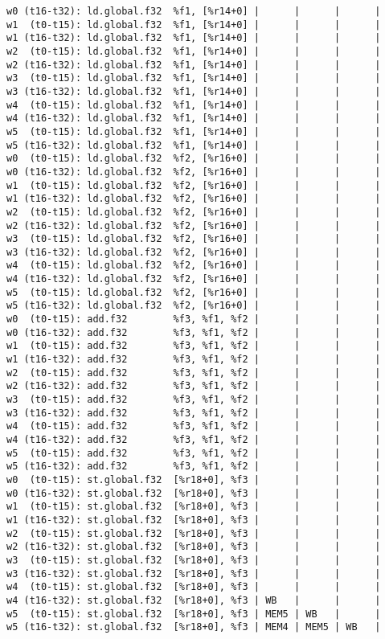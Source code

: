 \documentclass[11pt]{article}
\begin{document}
\begin{Answer}
\begin{verbatim}
w0 (t16-t32): ld.global.f32  %f1, [%r14+0] |      |      |      | 
w1  (t0-t15): ld.global.f32  %f1, [%r14+0] |      |      |      | 
w1 (t16-t32): ld.global.f32  %f1, [%r14+0] |      |      |      | 
w2  (t0-t15): ld.global.f32  %f1, [%r14+0] |      |      |      | 
w2 (t16-t32): ld.global.f32  %f1, [%r14+0] |      |      |      |
w3  (t0-t15): ld.global.f32  %f1, [%r14+0] |      |      |      |
w3 (t16-t32): ld.global.f32  %f1, [%r14+0] |      |      |      |
w4  (t0-t15): ld.global.f32  %f1, [%r14+0] |      |      |      |
w4 (t16-t32): ld.global.f32  %f1, [%r14+0] |      |      |      |
w5  (t0-t15): ld.global.f32  %f1, [%r14+0] |      |      |      |
w5 (t16-t32): ld.global.f32  %f1, [%r14+0] |      |      |      |
w0  (t0-t15): ld.global.f32  %f2, [%r16+0] |      |      |      |
w0 (t16-t32): ld.global.f32  %f2, [%r16+0] |      |      |      |
w1  (t0-t15): ld.global.f32  %f2, [%r16+0] |      |      |      |
w1 (t16-t32): ld.global.f32  %f2, [%r16+0] |      |      |      |
w2  (t0-t15): ld.global.f32  %f2, [%r16+0] |      |      |      |
w2 (t16-t32): ld.global.f32  %f2, [%r16+0] |      |      |      |
w3  (t0-t15): ld.global.f32  %f2, [%r16+0] |      |      |      |
w3 (t16-t32): ld.global.f32  %f2, [%r16+0] |      |      |      |
w4  (t0-t15): ld.global.f32  %f2, [%r16+0] |      |      |      |
w4 (t16-t32): ld.global.f32  %f2, [%r16+0] |      |      |      |
w5  (t0-t15): ld.global.f32  %f2, [%r16+0] |      |      |      |
w5 (t16-t32): ld.global.f32  %f2, [%r16+0] |      |      |      |
w0  (t0-t15): add.f32        %f3, %f1, %f2 |      |      |      |
w0 (t16-t32): add.f32        %f3, %f1, %f2 |      |      |      |
w1  (t0-t15): add.f32        %f3, %f1, %f2 |      |      |      | 
w1 (t16-t32): add.f32        %f3, %f1, %f2 |      |      |      | 
w2  (t0-t15): add.f32        %f3, %f1, %f2 |      |      |      | 
w2 (t16-t32): add.f32        %f3, %f1, %f2 |      |      |      | 
w3  (t0-t15): add.f32        %f3, %f1, %f2 |      |      |      | 
w3 (t16-t32): add.f32        %f3, %f1, %f2 |      |      |      | 
w4  (t0-t15): add.f32        %f3, %f1, %f2 |      |      |      | 
w4 (t16-t32): add.f32        %f3, %f1, %f2 |      |      |      |
w5  (t0-t15): add.f32        %f3, %f1, %f2 |      |      |      |
w5 (t16-t32): add.f32        %f3, %f1, %f2 |      |      |      |
w0  (t0-t15): st.global.f32  [%r18+0], %f3 |      |      |      |
w0 (t16-t32): st.global.f32  [%r18+0], %f3 |      |      |      |
w1  (t0-t15): st.global.f32  [%r18+0], %f3 |      |      |      |
w1 (t16-t32): st.global.f32  [%r18+0], %f3 |      |      |      |
w2  (t0-t15): st.global.f32  [%r18+0], %f3 |      |      |      |
w2 (t16-t32): st.global.f32  [%r18+0], %f3 |      |      |      |
w3  (t0-t15): st.global.f32  [%r18+0], %f3 |      |      |      |
w3 (t16-t32): st.global.f32  [%r18+0], %f3 |      |      |      |
w4  (t0-t15): st.global.f32  [%r18+0], %f3 |      |      |      |
w4 (t16-t32): st.global.f32  [%r18+0], %f3 | WB   |      |      |
w5  (t0-t15): st.global.f32  [%r18+0], %f3 | MEM5 | WB   |      |
w5 (t16-t32): st.global.f32  [%r18+0], %f3 | MEM4 | MEM5 | WB   |
\end{verbatim}


\end{Answer}

\newpage
\end{document}
